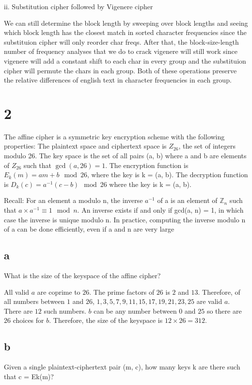 \documentclass[11pt]{article}
\begin{document}
ii. Substitution cipher followed by Vigenere cipher

We can still determine the block length by sweeping over block lengths and seeing which block length has the closest match in sorted character frequencies since the substituion cipher will only reorder char freqs. After that, the block-size-length number of frequency analyses that we do to crack vigenere will still work since vigenere will add a constant shift to each char in every group and the substituion cipher will permute the chars in each group. Both of these operations preserve the relative differences of english text in character frequencies in each group.


\section{2}

The aﬃne cipher is a symmetric key encryption scheme with the following properties: The plaintext space and ciphertext space is $Z_{26}$, the set of integers modulo 26. The key space is the set of all pairs (a, b) where a and b are elements of $Z_{26}$ such that $\gcd(a, 26) = 1$. The encryption function is $E_k(m) = am + b \mod 26$, where the key is k = (a, b). The decryption function is $D_k(c) = a^{-1}(c - b) \mod 26$ where the key is k = (a, b). 

Recall: For an element a modulo n, the inverse $a^{-1}$ of a is an element of $\mathbb{Z}_n$ such that $a \times a^{-1} \equiv 1 \mod n$. An inverse exists if and only if gcd(a, n) = 1, in which case the inverse is unique modulo n. In practice, computing the inverse modulo n of a can be done eﬃciently, even if a and n are very large

\subsection{a}  What is the size of the keyspace of the aﬃne cipher?

All valid $a$ are coprime to $26$. The prime factors of $26$ is $2$ and $13$. Therefore, of all numbers between $1$ and $26$, $1,3,5,7,9,11,15,17,19,21,23,25$ are valid $a$. There are $12$ such numbers. $b$ can be any number between $0$ and $25$ so there are $26$ choices for $b$. Therefore, the size of the keyspace is $12 \times 26 = 312$.

\subsection{b} Given a single plaintext-ciphertext pair (m, c), how many keys k are there such that c = Ek(m)?
\end{document}
